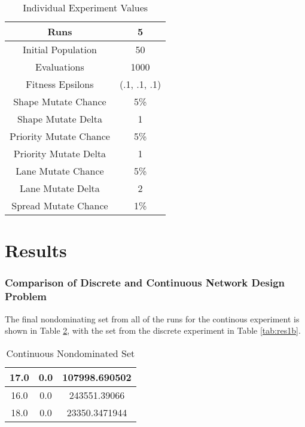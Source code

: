 \documentclass[11pt, oneside, notitlepage, final]{article}
\begin{document}
        \begin{table}[H]
        \label{tab:ex2}
        \centering
        \begin{tabular}{ | c | c |}
            \hline
            Runs                &       5           \\ \hline
            Initial Population  &       50          \\ \hline
            Evaluations         &       1000        \\ \hline
            Fitness Epsilons    &       (.1, .1, .1)\\ \hline
            Shape Mutate Chance &       5\%         \\ \hline
            Shape Mutate Delta  &       1           \\ \hline
            Priority Mutate Chance &    5\%         \\ \hline
            Priority Mutate Delta &     1           \\ \hline
            Lane Mutate Chance    &     5\%         \\ \hline
            Lane Mutate Delta     &     2          \\ \hline
            Spread Mutate Chance  &     1\%         \\ \hline
        \end{tabular}
        \caption{Individual Experiment Values}
        \end{table}


\part{Results}
    \setcounter{section}{0}
    \section{Comparison of Discrete and Continuous Network Design Problem}
        The final nondominating set from all of the runs for the continous experiment is shown in Table \ref{tab:res1a}, with the set from the discrete experiment in Table \ref{tab:res1b}.

    \begin{table}[H]
        \label{tab:res1a}
        \centering
        \begin{tabular}{ | c | c | c | }
            \hline
            17.0 & 0.0 & 107998.690502 \\ \hline
            16.0 & 0.0 & 243551.39066 \\ \hline
            18.0 & 0.0 & 23350.3471944 \\ \hline
        \end{tabular}
        \caption{Continuous Nondominated Set}
    \end{table}
\end{document}
